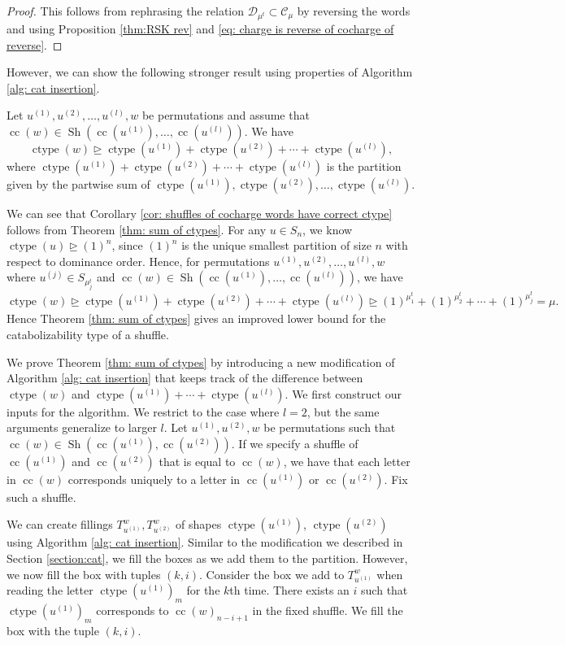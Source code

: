 \documentclass[ALCO, Unicode]{cedram}
\DeclareMathOperator{\ctype}{ctype}
\DeclareMathOperator{\sh}{Sh}
\DeclareMathOperator{\cc}{cc}
\begin{document}
\begin{proof}
This follows from rephrasing the relation $\mathcal{D}_{\mu^t} \subset \mathcal{C}_\mu$ by reversing the words and using Proposition \ref{thm:RSK rev} and \eqref{eq: charge is reverse of cocharge of reverse}.
\end{proof}
However, we can show the following stronger result using properties of Algorithm \ref{alg: cat insertion}.
\begin{thm2}\label{thm: sum of ctypes}
    Let $u^{(1)}, u^{(2)}, \dots, u^{(l)}, w$ be
    permutations and assume that $\cc(w) \in \sh(\cc(u^{(1)}),\dots, \cc(u^{(l)}))$.
    We have
    \[\ctype(w) \unrhd \ctype(u^{(1)}) + \ctype( u^{(2)}) + \cdots+ \ctype(u^{(l)}),\]
    where $\ctype(u^{(1)}) + \ctype( u^{(2)}) + \cdots +  \ctype(u^{(l)})$ is the partition given by the partwise sum of $\ctype(u^{(1)}),\ctype( u^{(2)}),\dots,\ctype(u^{(l)})$.
    \end{thm2}

We can see that Corollary \ref{cor: shuffles of cocharge words have correct ctype} follows from Theorem \ref{thm: sum of ctypes}. 
For any $u \in S_n$, we know $\ctype(u) \unrhd (1)^n$, since $(1)^{n}$ is the unique smallest partition of size $n$ with respect to dominance order. Hence, for permutations  $u^{(1)}, u^{(2)}, \dots, u^{(l)}, w$  where $u^{(j)}  \in S_{\mu^t_j}$ and $\cc(w) \in \sh(\cc(u^{(1)}),\dots, \cc(u^{(l)}))$, we have
\[\ctype(w) \unrhd \ctype(u^{(1)}) + \ctype( u^{(2)}) + \cdots+ \ctype(u^{(l)}) \unrhd (1)^{\mu^t_1} + (1)^{\mu^t_2} + \cdots + (1)^{\mu^t_j } = \mu.\]
Hence Theorem \ref{thm: sum of ctypes} gives an improved lower bound for the catabolizability type of a shuffle. 

We prove Theorem \ref{thm: sum of ctypes} by introducing a new modification of Algorithm \ref{alg: cat insertion} that keeps track of the difference between $\ctype(w)$ and $\ctype(u^{(1)}) +\cdots +\ctype(u^{(l)})$. 
We first construct our inputs for the algorithm. We restrict to the case where $l = 2$, but the same arguments generalize to larger $l.$
Let $u^{(1)}, u^{(2)},w$ be permutations such that $\cc(w)\in \sh(\cc(u^{(1)}),\cc(u^{(2)}))$. 
If we specify a shuffle of $\cc(u^{(1)})$ and $\cc(u^{(2)})$ that is equal to $\cc(w)$, we have that each letter in $\cc(w)$ corresponds uniquely to a letter in $\cc(u^{(1)})$ or $\cc(u^{(2)})$. Fix such a shuffle. 

We can create fillings $T^{w}_{u^{(1)}},T^w_{u^{(2)}}$ of shapes $\ctype(u^{(1)})$, $\ctype(u^{(2)})$ using Algorithm \ref{alg: cat insertion}. 
Similar to the modification we described in Section \ref{section:cat}, we fill the boxes as we add them to the partition. 
However, we now fill the box with tuples $(k,i)$. 
Consider the box we add to $T^{w}_{u^{(1)}}$ when reading the letter $\ctype(u^{(1)})_{m}$ for the $k$th time. There exists an $i$ such that $\ctype(u^{(1)})_{m}$ corresponds to $\cc(w)_{n-i+1}$ in the fixed shuffle. We fill the box with the tuple $(k,i)$. 
\end{document}
